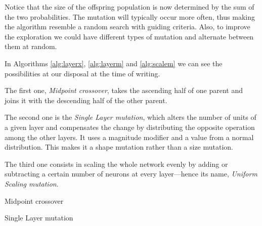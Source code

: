 	\vspace{0.3cm}

	Notice that the size of the offspring population is now determined by the sum of the two probabilities. The mutation will typically occur more often, thus making the algorithm resemble a random search with guiding criteria.	Also, to improve the exploration we could have different types of mutation and alternate between them at random.

	In Algorithms \ref{alg:layerx}, \ref{alg:layerm} and \ref{alg:scalem} we can see the possibilities at our disposal at the time of writing.

	The first one, \textit{Midpoint crossover}, takes the ascending half of one parent and joins it with the descending half of the other parent.

	The second one is the \textit{Single Layer mutation}, which alters the number of units of a given layer and compensates the change by distributing the opposite operation among the other layers. It uses a magnitude modifier and a value from a normal distribution. This makes it a shape mutation rather than a size mutation.

	The third one consists in scaling the whole network evenly by adding or subtracting a certain number of neurons at every layer---hence its name, \textit{Uniform Scaling mutation}.

	\vspace{0.3cm}

	\begin{algorithm}[H]\label{alg:layerx}


		\caption{Midpoint crossover}

	\end{algorithm}

	\vspace{0.3cm}

	\begin{algorithm}[H]\label{alg:layerm}


		\caption{Single Layer mutation}

	\end{algorithm}

